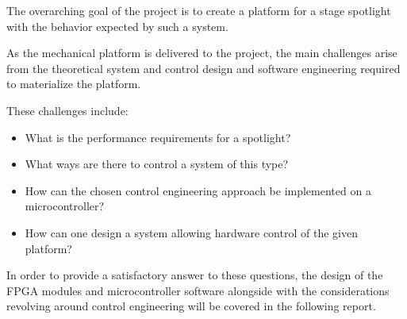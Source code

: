 \documentclass[../../main]{subfiles}
\begin{document}
The overarching goal of the project is to create a platform for a stage spotlight with the behavior expected by such a system.

As the mechanical platform is delivered to the project, the main challenges arise from the theoretical system and control design and software engineering required to materialize the platform.

These challenges include:

\begin{itemize}
    \item What is the performance requirements for a spotlight?
    \item What ways are there to control a system of this type?
    \item How can the chosen control engineering approach be implemented on a microcontroller?
    \item How can one design a system allowing hardware control of the given platform?
\end{itemize}

In order to provide a satisfactory answer to these questions, the design of the FPGA modules and microcontroller software alongside with the considerations revolving around control engineering will be covered in the following report.
\end{document}
